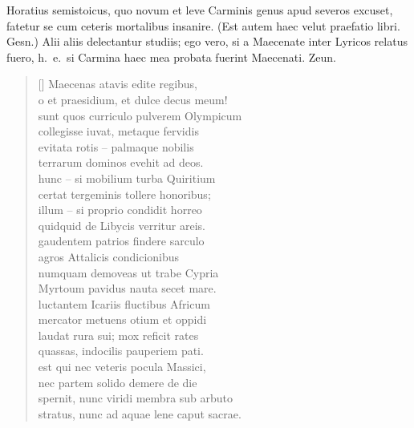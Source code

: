 
Horatius semistoicus, quo novum et leve Carminis genus apud severos excuset, fatetur se cum ceteris mortalibus insanire. (Est autem haec velut praefatio libri. Gesn.) Alii aliis delectantur studiis; ego vero, si a Maecenate inter Lyricos relatus fuero, h.\ e.\ si Carmina haec mea probata fuerint Maecenati. Zeun.






\settowidth{\versewidth}{sunt quos curriculo pulverem Olympicum}
\begin{verse}[\versewidth]
{\large
Maecenas atavis edite regibus,\\
o et praesidium, et dulce decus meum!\\
sunt quos curriculo pulverem Olympicum\\
collegisse iuvat, metaque fervidis\\
evitata rotis – palmaque nobilis\\
terrarum dominos evehit ad deos.\\
hunc – si mobilium turba Quiritium\\
certat tergeminis tollere honoribus;\\
illum – si proprio condidit horreo\\
quidquid de Libycis verritur areis.\\
gaudentem patrios findere sarculo\\
agros Attalicis condicionibus\\
numquam demoveas ut trabe Cypria\\
Myrtoum pavidus nauta secet mare.\\
luctantem Icariis fluctibus Africum\\
mercator metuens otium et oppidi\\
laudat rura sui; mox reficit rates\\
quassas, indocilis pauperiem pati.\\
est qui nec veteris pocula Massici,\\
nec partem solido demere de die\\
spernit, nunc viridi membra sub arbuto\\
stratus, nunc ad aquae lene caput sacrae.\\
}
\end{verse}
